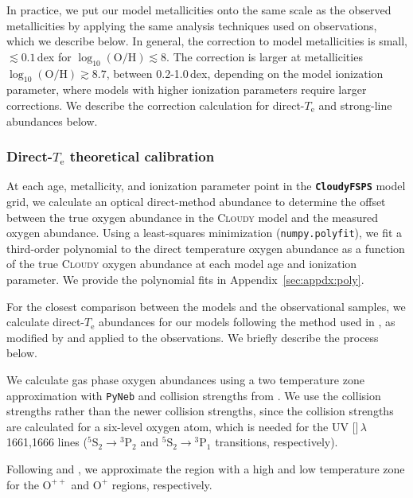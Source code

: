 \documentclass[preprint2]{aastex62}
\newcommand{\CloudyFSPS}{{\tt \textbf{CloudyFSPS}}\xspace}
\newcommand{\Cloudy}{\textsc{Cloudy}\xspace}
\newcommand{\hii}{\ion{H}{2}}
\newcommand{\oiii}{[\ion{O}{3}]}
\newcommand{\logten}{\ensuremath{\log_{10}}}
\newcommand{\logOH}{\ensuremath{\logten (\mathrm{O}/\mathrm{H})}\xspace}
\newcommand{\Te}{\ensuremath{T_{\mathrm{e}}}\xspace}
\begin{document}
In practice, we put our model metallicities onto the same scale as the observed metallicities by applying the same analysis techniques used on observations, which we describe below. In general, the correction to model metallicities is small, $\lesssim 0.1$\,dex for \logOH$ \lesssim 8$. The correction is larger at metallicities \logOH$\gtrsim 8.7$, between 0.2-1.0\,dex, depending on the model ionization parameter, where models with higher ionization parameters require larger corrections. We describe the correction calculation for direct-\Te and strong-line abundances below.

\subsubsection{Direct-\Te theoretical calibration}\label{sec:Z:corr:Te}

At each age, metallicity, and ionization parameter point in the \CloudyFSPS model grid, we calculate an optical direct-method abundance to determine the offset between the true oxygen abundance in the \Cloudy model and the measured oxygen abundance. Using a least-squares minimization ({\tt numpy.polyfit}), we fit a third-order polynomial to the direct temperature oxygen abundance as a function of the true \Cloudy oxygen abundance at each model age and ionization parameter. We provide the polynomial fits in Appendix~\ref{sec:appdx:poly}.

For the closest comparison between the models and the observational samples, we calculate direct-\Te abundances for our models following the method used in \citet{Garnett+1992}, as modified by \citet{Berg+2015} and applied to the \citet{Berg+2016} observations. We briefly describe the process below.

We calculate gas phase oxygen abundances using a two temperature zone approximation with {\tt PyNeb} \citep{PyNeb} and collision strengths from \citet{Aggarwal+1999}. We use the \citet{Aggarwal+1999} collision strengths rather than the newer \citet{Storey+2014} collision strengths, since the \citet{Aggarwal+1999} collision strengths are calculated for a six-level oxygen atom, which is needed for the UV \oiii$\,\lambda$1661,1666 lines (${}^5\mathrm{S}_2 \rightarrow {}^3\mathrm{P}_2$ and ${}^5\mathrm{S}_2 \rightarrow {}^3\mathrm{P}_1$ transitions, respectively).

Following \citet{Garnett+1992} and \citet{Berg+2015}, we approximate the \hii{} region with a high and low temperature zone for the $\mathrm{O}^{++}$ and $\mathrm{O}^{+}$ regions, respectively.
\end{document}
